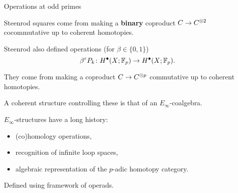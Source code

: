 
\begin{frame}{Operations at odd primes}

	\pause

	Steenrod squares come from making a \textbf{binary} coproduct $C \to C^{\otimes 2}$ cocommutative up to coherent homotopies.

	\medskip\pause

	Steenrod also defined operations (for $\beta \in \{0,1\}$)
	\[
	\beta^{\varepsilon} P_k \colon H^\bullet(X; {\mathbb{F}_p}) \to H^\bullet(X; {\mathbb{F}_p}).
	\]

	\pause

	They come from making a coproduct $C \to C^{\otimes p}$ commutative up to coherent homotopies.

	\medskip\pause

	A coherent structure controlling these is that of an $E_\infty$-coalgebra.

	\medskip\pause

	$E_\infty$-structures have a long history:
	\begin{itemize}
		\item (co)homology operations,
		\item recognition of infinite loop spaces,
		\item algebraic representation of the $p$-adic homotopy category.
	\end{itemize}

	\medskip\pause

	Defined using framework of operads.
\end{frame}


